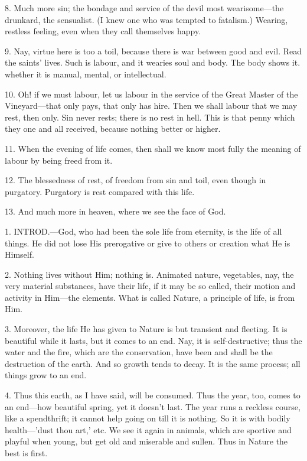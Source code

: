 8. Much more sin; the bondage and service of the
devil most wearisome—the drunkard, the sensualist. (I knew one who
was tempted to fatalism.) Wearing, restless feeling, even when they
call themselves happy.

9. Nay, virtue here is too a toil, because there
is war between good and evil. Read the saints' lives. Such is labour,
and it wearies soul and body. The body shows it. whether it is manual,
mental, or intellectual.

10. Oh! if we must labour, let us labour in the
service of the Great Master of the Vineyard—that only pays, that
only has hire. Then we shall labour that we may rest, then only. Sin
never rests; there is no rest in hell. This is that penny which they
one and all received, because nothing better or higher.

11. When the evening of life comes, then shall we
know most fully the meaning of labour by being freed from it.

12. The blessedness of rest, of freedom from sin
and toil, even though in purgatory. Purgatory is rest compared with
this life.

13. And much more in heaven, where we see the
face of God.


1. INTROD.—God,
who had been the sole life from eternity, is the life of all things.
He did not lose His prerogative or give to others or creation what He
is Himself.

2. Nothing lives without Him; nothing is.
Animated nature, vegetables, nay, the very material substances, have
their life, if it may be so called, their motion and activity in
Him—the elements. What is called Nature, a principle of life, is
from Him.

3. Moreover, the life He has given to Nature is
but transient and fleeting. It is beautiful while it lasts, but it
comes to an end. Nay, it is self-destructive; thus the water and the
fire, which are the conservation, have been and shall be the
destruction of the earth. And so growth tends to decay. It is the same
process; all things grow to an end.

4. Thus this earth, as I have said, will be
consumed. Thus the year, too, comes to an end—how beautiful spring,
yet it doesn't last. The year runs a reckless course, like a
spendthrift; it cannot help going on till it is nothing. So it is with
bodily health—'dust thou art,' etc. We see it again in animals,
which are sportive and playful when young, but get old and miserable
and sullen. Thus in Nature the best is first.

